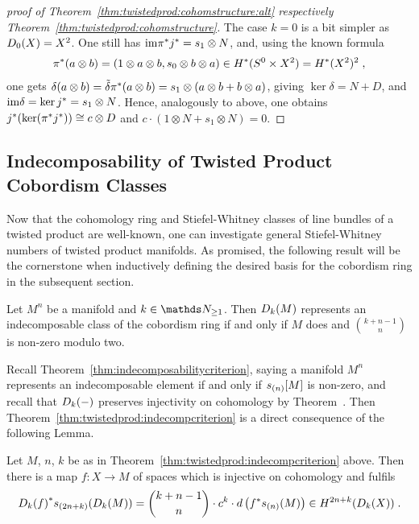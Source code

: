 \begin{proof}[proof of
  Theorem~\ref{thm:twistedprod:cohomstructure:alt}
  respectively Theorem~\ref{thm:twistedprod:cohomstructure}]
  The case $k=0$ is a bit simpler as
  $D_{0}({X})=X^2$. One still has
  $\mathrm{im}{\pi}^*{j}^*=s_1\otimes N$, and, using the known formula
  \begin{gather*}
    {\pi}^*(a\otimes b)=(1\otimes a\otimes b, s_0\otimes b\otimes a)
    \in H^*(S^0\times X^2)=H^*(X^2)^2
    \;,
  \end{gather*}
  one gets
  $\delta(a\otimes b)
  = \tilde\delta{\pi}^*(a\otimes b)
  = s_1\otimes(a\otimes b + b\otimes a)$, giving
  $\ker\delta=N+D$, and $\mathrm{im}\delta = \ker{j}^* = s_1\otimes N$.
  Hence, analogously to above, one obtains
  ${j}^* (\ker({\pi}^*{j}^*)) \cong c\otimes D$ and
  $c\cdot (1\otimes N + s_1\otimes N) = 0$.
\end{proof}


\subsection{Indecomposability of Twisted Product Cobordism Classes}
\label{sec:twistedprod:indecompcriterion}
Now that the cohomology ring and Stiefel-Whitney classes of line
bundles of a twisted product are well-known, one can investigate
general Stiefel-Whitney numbers of twisted product manifolds.
As promised, the following result will be the cornerstone when inductively
defining the desired basis for the cobordism ring in the subsequent section.
\begin{Thm}\label{thm:twistedprod:indecompcriterion}
  Let $M^n$ be a manifold and $k\in\Nat_{\geq1}$.
  Then $D_{k}({M})$ represents an indecomposable class of the
  cobordism ring if and only if $M$ does and $\binom{k+n-1}{n}$ is
  non-zero modulo two.
\end{Thm}
Recall Theorem~\ref{thm:indecomposabilitycriterion}, saying
a manifold $M^n$ represents an indecomposable element if and only if
$s_{(n)}[M]$ is non-zero,
and recall that $D_{k}({-})$ preserves injectivity on
cohomology by
Theorem~.
Then Theorem~\ref{thm:twistedprod:indecompcriterion} is a
direct consequence of the following Lemma.
\begin{Lem}\label{lem:twistedprod:indecompcriterion}
  Let $M$, $n$, $k$ be as in
  Theorem~\ref{thm:twistedprod:indecompcriterion} above.
  Then there is a map $f\colon X\to M$ of spaces which is injective on
  cohomology and fulfils
  \begin{gather*}
    {D_{k}({f})}^* s_{(2n+k)}(D_{k}({M}))
    = \binom{k+n-1}{n} \cdot c^k
    \cdot d\left( {f}^* s_{(n)}(M) \right)
    \in H^{2n+k}(D_{k}({X}))
    \;.
  \end{gather*}
\end{Lem}
